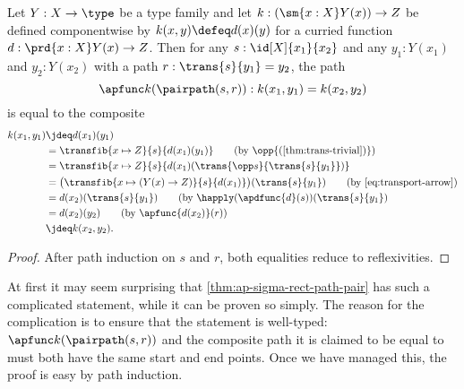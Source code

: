 \begin{lem}\label{thm:ap-sigma-rect-path-pair}
  Let $Y:X\to\type$ be a type family and let $k:(\sm{x:X}Y(x)) \to Z$ be defined componentwise by $k(x,y) \defeq d(x)(y)$ for a curried function $d:\prd{x:X} Y(x)\to Z$.
  Then for any $s:\id[X]{x_1}{x_2}$ and any $y_1:Y(x_1)$ and $y_2:Y(x_2)$ with a path $r:\trans{s}{y_1}=y_2$, the path
  \[\apfunc k (\pairpath(s,r)) :k(x_1,y_1) = k(x_2,y_2)\]
  is equal to the composite
  \begin{align}
    k(x_1,y_1)
    &\jdeq d(x_1)(y_1) \notag\\
    &= \transfib{x\mapsto Z}{s}{d(x_1)(y_1)}
    \tag{by $\opp{\text{(\cref{thm:trans-trivial})}}$}\\
    &= \transfib{x\mapsto Z}{s}{d(x_1)(\trans{\opp s}{\trans{s}{y_1}})}
    \notag\\
    &= \big(\transfib{x\mapsto (Y(x)\to Z)}{s}{d(x_1)}\big)(\trans{s}{y_1})
    \tag{by~\eqref{eq:transport-arrow}}\\
    &= d(x_2)(\trans{s}{y_1})
    \tag{by $\happly(\apdfunc{d}(s))(\trans{s}{y_1}$}\\
    &= d(x_2)(y_2)
    \tag{by $\apfunc{d(x_2)}(r)$}\\
    &\jdeq k(x_2,y_2).
    \notag
  \end{align}
\end{lem}
\begin{proof}
  After path induction on $s$ and $r$, both equalities reduce to reflexivities.
\end{proof}

At first it may seem surprising that \cref{thm:ap-sigma-rect-path-pair} has such a complicated statement, while it can be proven so simply.
The reason for the complication is to ensure that the statement is well-typed: $\apfunc k (\pairpath(s,r))$ and the composite path it is claimed to be equal to must both have the same start and end points.
Once we have managed this, the proof is easy by path induction.

